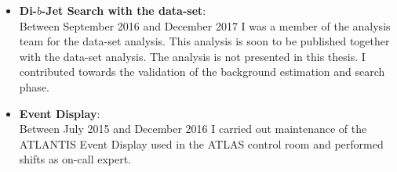 \begin{itemize}[leftmargin=*]
\begin{itemize}
  \end{itemize}
  \vspace{1em}
\item\textbf{Di-$b$-Jet Search  with the \hm{} data-set}: \\
  Between September 2016 and December 2017 I was a member of the analysis team for the \hm{} data-set analysis.
  This analysis is soon to be published together with the \lm{} data-set analysis.
  The analysis is not presented in this thesis.
  I contributed towards the validation of the background estimation and search phase.\vspace{1em}
\item\textbf{Event Display}: \\
  Between July 2015 and December 2016 I carried out maintenance of the {\sc ATLANTIS} Event Display used in the ATLAS control room
  and performed shifts as on-call expert.
\end{itemize}

